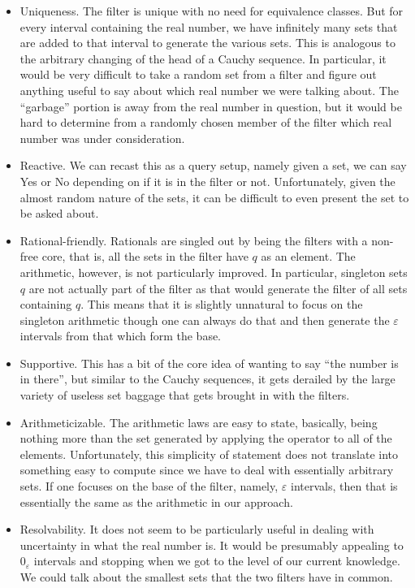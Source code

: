 \documentclass[12pt]{article}
\theoremstyle{remark}
\begin{document}
\begin{itemize}
    \item Uniqueness. The filter is unique with no need for equivalence classes. But for every interval containing the real number, we have infinitely many sets that are added to that interval to generate the various sets. This is analogous to the arbitrary changing of the head of a Cauchy sequence. In particular, it would be very difficult to take a random set from a filter and figure out anything useful to say about which real number we were talking about. The ``garbage'' portion is away from the real number in question, but it would be hard to determine from a randomly chosen member of the filter which real number was under consideration. 
    \item Reactive. We can recast this as a query setup, namely given a set, we can say Yes or No depending on if it is in the filter or not. Unfortunately, given the almost random nature of the sets, it can be difficult to even present the set to be asked about. 
    \item Rational-friendly. Rationals are singled out by being the filters with a non-free core, that is, all the sets in the filter have $q$ as an element. The arithmetic, however, is not particularly improved. In particular, singleton sets $q$ are not actually part of the filter as that would generate the filter of all sets containing $q$. This means that it is slightly unnatural to focus on the singleton arithmetic though one can always do that and then generate the $\varepsilon$ intervals from that which form the base. 
    \item Supportive. This has a bit of the core idea of wanting to say ``the number is in there'', but similar to the Cauchy sequences, it gets derailed by the large variety of useless set baggage that gets brought in with the filters. 
    \item Arithmeticizable. The arithmetic laws are easy to state, basically, being nothing more than the set generated by applying the operator to all of the elements. Unfortunately, this simplicity of statement does not translate into something easy to compute since we have to deal with essentially arbitrary sets. If one focuses on the base of the filter, namely, $\varepsilon$ intervals, then that is essentially the same as the arithmetic in our approach. 
    \item Resolvability. It does not seem to be particularly useful in dealing with uncertainty in what the real number is. It would be presumably appealing to $0_{\varepsilon}$ intervals and stopping when we got to the level of our current knowledge. We could talk about the smallest sets that the two filters have in common. 
\end{itemize}
\end{document}
